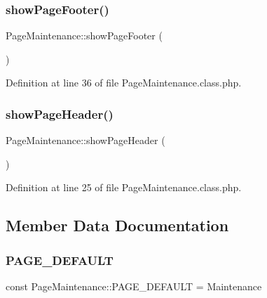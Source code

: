 \subsubsection{\texorpdfstring{show\+Page\+Footer()}{showPageFooter()}}
{\footnotesize\ttfamily Page\+Maintenance\+::show\+Page\+Footer (\begin{DoxyParamCaption}{ }\end{DoxyParamCaption})}



Definition at line 36 of file Page\+Maintenance.\+class.\+php.

\mbox{\label{class_page_maintenance_a33a8d59dd6e8fe5d7fbc3f24ada425c7}} 
\subsubsection{\texorpdfstring{show\+Page\+Header()}{showPageHeader()}}
{\footnotesize\ttfamily Page\+Maintenance\+::show\+Page\+Header (\begin{DoxyParamCaption}{ }\end{DoxyParamCaption})}



Definition at line 25 of file Page\+Maintenance.\+class.\+php.



\subsection{Member Data Documentation}
\mbox{\label{class_page_maintenance_a476248e2c6d7e684b296d513030e1899}} 
\subsubsection{\texorpdfstring{P\+A\+G\+E\+\_\+\+D\+E\+F\+A\+U\+LT}{PAGE\_DEFAULT}}
{\footnotesize\ttfamily const Page\+Maintenance\+::\+P\+A\+G\+E\+\_\+\+D\+E\+F\+A\+U\+LT = \textquotesingle{}Maintenance\textquotesingle{}}



